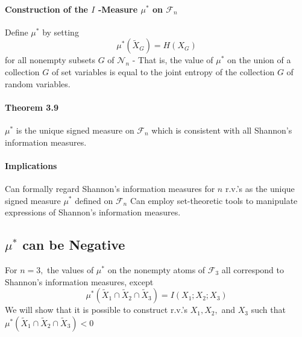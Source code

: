 \documentclass[8pt]{article}
\begin{document}
\begin{tcolorbox}
\paragraph{Construction of the $I$ -Measure $\mu^{*}$ on $\mathcal{F}_{n}$}
Define $\mu^{*}$ by setting
$$
\mu^{*}\left(\tilde{X}_{G}\right)=H\left(X_{G}\right)
$$
for all nonempty subsets $G$ of $\mathcal{N}_{n}$
- That is, the value of $\mu^{*}$ on the union of a collection $G$ of set variables is equal to the joint entropy of the collection $G$ of random variables.
\end{tcolorbox}
\begin{tcolorbox}
\paragraph{Theorem 3.9} $\mu^{*}$ is the unique signed measure on $\mathcal{F}_{n}$ which is consistent with all Shannon's information measures.
\\
\paragraph{Implications}
Can formally regard Shannon's information measures for $n$ r.v.'s as the unique signed measure $\mu^{*}$ defined on $\mathcal{F}_{n}$
Can employ set-theoretic tools to manipulate expressions of Shannon's information measures.
\end{tcolorbox}

\newpage
\subsection{$\mu^{*}$ can be Negative}
For $n=3,$ the values of $\mu^{*}$ on the nonempty atoms of $\mathcal{F}_{3}$ all correspond to Shannon's information measures, except
$$
\mu^{*}\left(\tilde{X}_{1} \cap \tilde{X}_{2} \cap \tilde{X}_{3}\right)=I\left(X_{1} ; X_{2} ; X_{3}\right)
$$
We will show that it is possible to construct r.v.'s $X_{1}, X_{2},$ and $X_{3}$ such that $\mu^{*}\left(\tilde{X}_{1} \cap \tilde{X}_{2} \cap \tilde{X}_{3}\right)<0$
\end{document}
